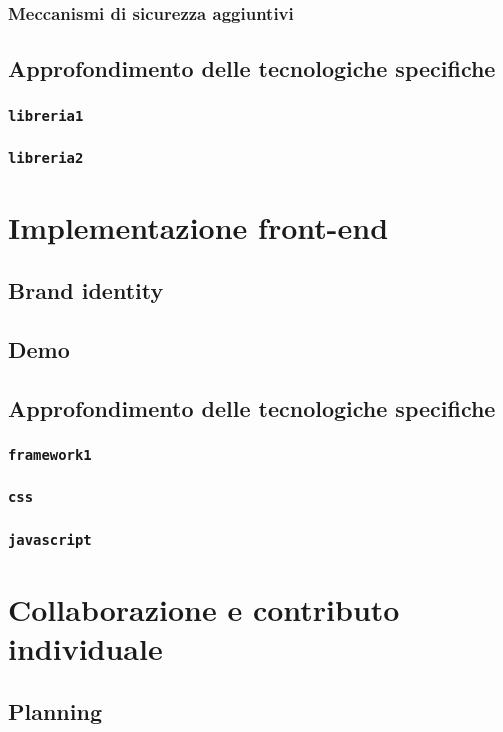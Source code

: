 \documentclass{report}
\begin{document}
\subsection{Meccanismi di sicurezza aggiuntivi}
\section{Approfondimento delle tecnologiche specifiche}
\subsection{\texttt{libreria1} }
\subsection{\texttt{libreria2} }

\chapter{Implementazione front-end}
\section{Brand identity}
\section{Demo}
\section{Approfondimento delle tecnologiche specifiche}
\subsection{\texttt{framework1} }
\subsection{\texttt{css} }
\subsection{\texttt{javascript} }

\chapter{Collaborazione e contributo individuale}
\section{Planning}
\end{document}
